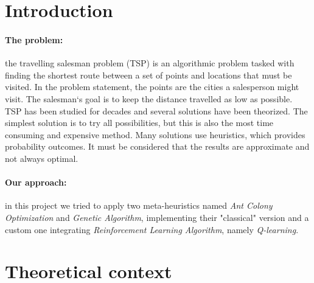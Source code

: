 \tableofcontents


\section{Introduction}
\paragraph{The problem:}
the travelling salesman problem (TSP) is an algorithmic problem tasked with finding the shortest route between a set of points and locations that must be visited. 
In the problem statement, the points are the cities a salesperson might visit. The salesman‘s goal is to keep the distance travelled as low as possible. 
TSP has been studied for decades and several solutions have been theorized. 
The simplest solution is to try all possibilities, but this is also the most time consuming and expensive method. 
Many solutions use heuristics, which provides probability outcomes. 
It must be considered that the results are approximate and not always optimal. 
\paragraph{Our approach:}
in this project we tried to apply two meta-heuristics named \textit{Ant Colony Optimization} and \textit{Genetic Algorithm}, implementing their "classical" version and a custom one integrating \textit{Reinforcement Learning Algorithm}, namely \textit{Q-learning}.

\section{Theoretical context}
